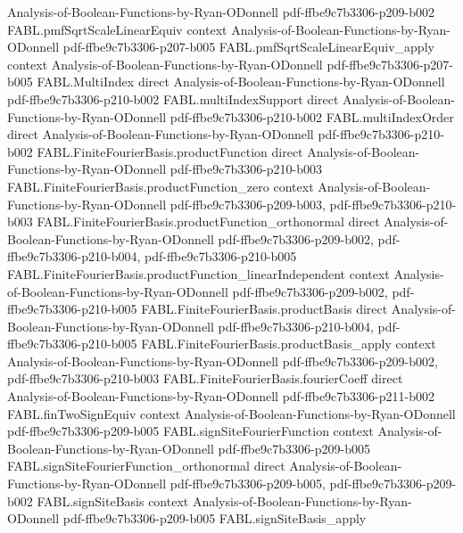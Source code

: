 \begin{theorem}
  {Analysis-of-Boolean-Functions-by-Ryan-ODonnell}
  {pdf-ffbe9c7b3306-p209-b002}
\proofstep
  {FABL.pmfSqrtScaleLinearEquiv}
  {context}
  {Analysis-of-Boolean-Functions-by-Ryan-ODonnell}
  {pdf-ffbe9c7b3306-p207-b005}
\proofstep
  {FABL.pmfSqrtScaleLinearEquiv_apply}
  {context}
  {Analysis-of-Boolean-Functions-by-Ryan-ODonnell}
  {pdf-ffbe9c7b3306-p207-b005}
\proofstep
  {FABL.MultiIndex}
  {direct}
  {Analysis-of-Boolean-Functions-by-Ryan-ODonnell}
  {pdf-ffbe9c7b3306-p210-b002}
\proofstep
  {FABL.multiIndexSupport}
  {direct}
  {Analysis-of-Boolean-Functions-by-Ryan-ODonnell}
  {pdf-ffbe9c7b3306-p210-b002}
\proofstep
  {FABL.multiIndexOrder}
  {direct}
  {Analysis-of-Boolean-Functions-by-Ryan-ODonnell}
  {pdf-ffbe9c7b3306-p210-b002}
\proofstep
  {FABL.FiniteFourierBasis.productFunction}
  {direct}
  {Analysis-of-Boolean-Functions-by-Ryan-ODonnell}
  {pdf-ffbe9c7b3306-p210-b003}
\proofstep
  {FABL.FiniteFourierBasis.productFunction_zero}
  {context}
  {Analysis-of-Boolean-Functions-by-Ryan-ODonnell}
  {pdf-ffbe9c7b3306-p209-b003,
    pdf-ffbe9c7b3306-p210-b003}
\proofstep
  {FABL.FiniteFourierBasis.productFunction_orthonormal}
  {direct}
  {Analysis-of-Boolean-Functions-by-Ryan-ODonnell}
  {pdf-ffbe9c7b3306-p209-b002,
    pdf-ffbe9c7b3306-p210-b004,
    pdf-ffbe9c7b3306-p210-b005}
\proofstep
  {FABL.FiniteFourierBasis.productFunction_linearIndependent}
  {context}
  {Analysis-of-Boolean-Functions-by-Ryan-ODonnell}
  {pdf-ffbe9c7b3306-p209-b002,
    pdf-ffbe9c7b3306-p210-b005}
\proofstep
  {FABL.FiniteFourierBasis.productBasis}
  {direct}
  {Analysis-of-Boolean-Functions-by-Ryan-ODonnell}
  {pdf-ffbe9c7b3306-p210-b004,
    pdf-ffbe9c7b3306-p210-b005}
\proofstep
  {FABL.FiniteFourierBasis.productBasis_apply}
  {context}
  {Analysis-of-Boolean-Functions-by-Ryan-ODonnell}
  {pdf-ffbe9c7b3306-p209-b002,
    pdf-ffbe9c7b3306-p210-b003}
\proofstep
  {FABL.FiniteFourierBasis.fourierCoeff}
  {direct}
  {Analysis-of-Boolean-Functions-by-Ryan-ODonnell}
  {pdf-ffbe9c7b3306-p211-b002}
\proofstep
  {FABL.finTwoSignEquiv}
  {context}
  {Analysis-of-Boolean-Functions-by-Ryan-ODonnell}
  {pdf-ffbe9c7b3306-p209-b005}
\proofstep
  {FABL.signSiteFourierFunction}
  {context}
  {Analysis-of-Boolean-Functions-by-Ryan-ODonnell}
  {pdf-ffbe9c7b3306-p209-b005}
\proofstep
  {FABL.signSiteFourierFunction_orthonormal}
  {direct}
  {Analysis-of-Boolean-Functions-by-Ryan-ODonnell}
  {pdf-ffbe9c7b3306-p209-b005,
    pdf-ffbe9c7b3306-p209-b002}
\proofstep
  {FABL.signSiteBasis}
  {context}
  {Analysis-of-Boolean-Functions-by-Ryan-ODonnell}
  {pdf-ffbe9c7b3306-p209-b005}
\proofstep
  {FABL.signSiteBasis_apply}

\end{theorem}
